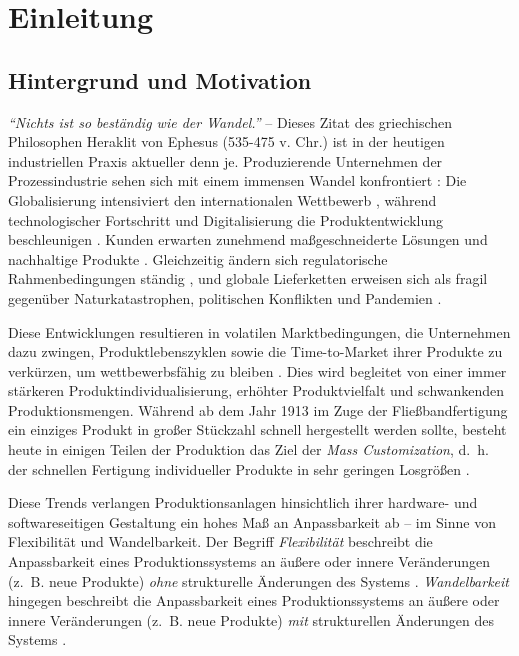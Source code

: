 
\chapter{Einleitung}
\label{chap:einleitung}

\section{Hintergrund und Motivation}
\label{sec:motivation}
 
\emph{\enquote{Nichts ist so beständig wie der Wandel.}} -- Dieses Zitat des griechischen Philosophen Heraklit von Ephesus (535-475 v. Chr.) ist in der heutigen industriellen Praxis aktueller denn je. Produzierende Unternehmen der Prozessindustrie sehen sich mit einem immensen Wandel konfrontiert \cite{Valluru.2024}: Die Globalisierung intensiviert den internationalen Wettbewerb \cite{Scheuermann.2025}, während technologischer Fortschritt und Digitalisierung die Produktentwicklung beschleunigen \cite{Deloitte.2023}. Kunden erwarten zunehmend maßgeschneiderte Lösungen \cite{Gro.2022} und nachhaltige Produkte \cite{RuthStrau.2024,Deloitte.2023}. Gleichzeitig ändern sich regulatorische Rahmenbedingungen ständig \cite{Uniquelifescience.2025}, und globale Lieferketten erweisen sich als fragil gegenüber Naturkatastrophen, politischen Konflikten und Pandemien \cite{Bossut.2025}.

Diese Entwicklungen resultieren in volatilen Marktbedingungen, die Unternehmen dazu zwingen, Produktlebenszyklen sowie die Time-to-Market ihrer Produkte zu verkürzen, um wettbewerbsfähig zu bleiben \cite{Lier.2015.DE}. Dies wird begleitet von einer immer stärkeren Produktindividualisierung, erhöhter Produktvielfalt und schwankenden Produktionsmengen. Während ab dem Jahr 1913 im Zuge der Fließbandfertigung ein einziges Produkt in großer Stückzahl schnell hergestellt werden sollte, besteht heute in einigen Teilen der Produktion das Ziel der \emph{Mass Customization}, d.~h. der schnellen Fertigung individueller Produkte in sehr geringen Losgrößen \cite{Kirchgeorg.2018}.

Diese Trends verlangen Produktionsanlagen hinsichtlich ihrer hardware- und softwareseitigen Gestaltung ein hohes Maß an Anpassbarkeit ab -- im Sinne von Flexibilität und Wandelbarkeit. Der Begriff \emph{Flexibilität} beschreibt die Anpassbarkeit eines Produktionssystems an äußere oder innere Veränderungen (z.~B. neue Produkte) \emph{ohne} strukturelle Änderungen des Systems \cite{VDI.5201-1}. \emph{Wandelbarkeit} hingegen beschreibt die Anpassbarkeit eines Produktionssystems an äußere oder innere Veränderungen (z.~B. neue Produkte) \emph{mit} strukturellen Änderungen des Systems \cite{VDI.5201-1}.

